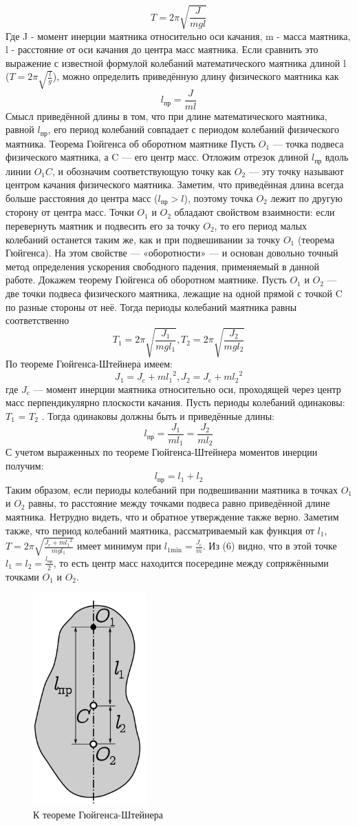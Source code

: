 \documentclass[a4paper, 10pt]{article}%
\begin{document}
\[T = 2 \pi \sqrt{\frac{J}{mgl}}\]
Где J - момент инерции маятника относительно оси качания, m - масса маятника, l - расстояние от оси качания до центра масс маятника. 
Если сравнить это выражение с известной формулой колебаний математического маятника длиной l ($T = 2 \pi \sqrt{\frac{l}{g}}$), можно определить приведённую длину физического маятника как 
\[l_\text{пр} = \frac{J}{ml}\]
Смысл приведённой длины в том, что при длине математического маятника, равной $l_\text{пр}$, его период колебаний совпадает с периодом колебаний физического маятника. 
Теорема Гюйгенса об оборотном маятнике 
Пусть $O_1$ — точка подвеса физического маятника, а C — его центр масс. Отложим отрезок длиной $l_\text{пр}$ вдоль линии $O_1 C$, и обозначим соответствующую точку как $O_2$ — эту точку называют центром качания физического маятника. Заметим, что приведённая длина всегда больше расстояния до центра масс ($l_\text{пр} > l$), поэтому точка $O_2$ лежит по другую сторону от центра масс. 
Точки $O_1$ и $O_2$ обладают свойством взаимности: если перевернуть маятник и подвесить его за точку $O_2$, то его период малых колебаний останется таким же, как и при подвешивании за точку $O_1$ (теорема Гюйгенса). На этом свойстве — «оборотности» — и основан довольно точный метод определения ускорения свободного падения, применяемый в данной работе. 
Докажем теорему Гюйгенса об оборотном маятнике. Пусть $O_1$ и $O_2$ — две точки подвеса физического маятника, лежащие на одной прямой с точкой C по разные стороны от неё. Тогда периоды колебаний маятника равны соответственно  
\[T_1 = 2 \pi \sqrt{\frac{J_1}{mgl_1}}, T_2 = 2 \pi \sqrt{\frac{J_2}{mgl_2}}\]
По теореме Гюйгенса-Штейнера имеем:
\[J_1 = J_\text{c} + m{l_1}^2 ,J_2 = J_\text{c} + m{l_2}^2 \]
где $J_\text{c}$ — момент инерции маятника относительно оси, проходящей через центр масс перпендикулярно плоскости качания. 
Пусть периоды колебаний одинаковы: $T_1$ = $T_2$ . Тогда одинаковы должны быть и приведённые длины: 
\[l_\text{пр} = \frac{J_1}{ml_1} = \frac{J_2}{ml_2}\]
С учетом выраженных по теореме Гюйгенса-Штейнера моментов инерции получим:
\[l_\text{пр} = l_1 + l_2\]
Таким образом, если периоды колебаний при подвешивании маятника в точках $O_1$ и $O_2$ равны, то расстояние между точками подвеса равно приведённой длине маятника. Нетрудно видеть, что и обратное утверждение также верно. 
Заметим также, что период колебаний маятника, рассматриваемый как функция от $l_1$, $T = 2 \pi \sqrt{\frac{J_\text{c} + m{l_1}^2}{mgl_1}}$ имеет минимум при $l_{1\text{min}} = \frac{J_\text{c}}{m}$. Из (6) видно, что в этой точке $l_1 = l_2 = \frac{l_\textbf{пр}}{2}$, то есть центр масс находится посередине между сопряжёнными точками $O_1$ и $O_2$. 
\begin{figure}
    \centering
    \includegraphics[width=0.15\linewidth]{pic1.png}
    \caption{К теореме Гюйгенса-Штейнера}
    \label{fig:enter-label}
\end{figure}
\end{document}
